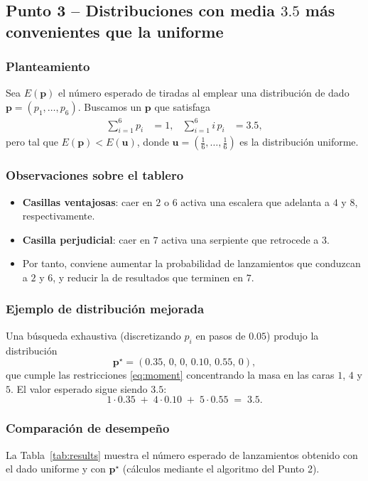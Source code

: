 \subsection{Punto 3 – Distribuciones con media $3.5$ más convenientes que la uniforme}

\subsubsection{Planteamiento}
Sea $E(\mathbf{p})$ el número esperado de tiradas al emplear una distribución de dado
$\mathbf{p} = (p_1,\dots,p_6)$.  Buscamos un $\mathbf{p}$ que satisfaga
\begin{align}
\sum_{i=1}^6 p_i &= 1,
&
\sum_{i=1}^6 i\,p_i &= 3.5, \label{eq:moment}
\end{align}
pero tal que $E(\mathbf{p}) < E(\mathbf{u})$, donde
$\mathbf{u}=(\tfrac16,\dots,\tfrac16)$ es la distribución uniforme.

\subsubsection{Observaciones sobre el tablero}
\begin{itemize}
  \item \textbf{Casillas ventajosas}: caer en \(2\) o \(6\) activa una escalera que adelanta
        a \(4\) y \(8\), respectivamente.
  \item \textbf{Casilla perjudicial}: caer en \(7\) activa una serpiente que retrocede a \(3\).
  \item Por tanto, conviene aumentar la probabilidad de lanzamientos que conduzcan a \(2\) y \(6\), 
        y reducir la de resultados que terminen en \(7\).
\end{itemize}

\subsubsection{Ejemplo de distribución mejorada}
Una búsqueda exhaustiva (discretizando $p_i$ en pasos de $0.05$)
produjo la distribución
\begin{equation}\label{eq:best}
\mathbf{p}^\star = (0.35,\,0,\,0,\,0.10,\,0.55,\,0),
\end{equation}
que cumple las restricciones \eqref{eq:moment} concentrando la masa
en las caras \(1\), \(4\) y \(5\).
El valor esperado sigue siendo \(3.5\):
\[
1\cdot 0.35 \;+\; 4\cdot 0.10 \;+\; 5\cdot 0.55 \;=\; 3.5.
\]

\subsubsection{Comparación de desempeño}
La Tabla~\ref{tab:results} muestra el número esperado de lanzamientos obtenido
con el dado uniforme y con $\mathbf{p}^\star$ (cálculos mediante el algoritmo del Punto 2).

